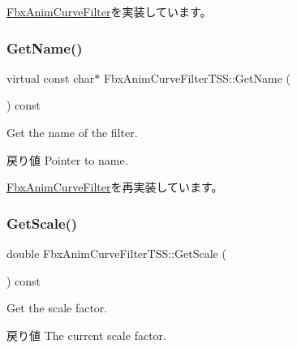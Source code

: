 \hyperlink{class_fbx_anim_curve_filter_a6a69996c47c0e6f63a0f8b0d5fa806a0}{Fbx\+Anim\+Curve\+Filter}を実装しています。

\mbox{\label{class_fbx_anim_curve_filter_t_s_s_acf96262688c855b1c9b5ead93247e758}} 
\subsubsection{\texorpdfstring{Get\+Name()}{GetName()}}
{\footnotesize\ttfamily virtual const char$\ast$ Fbx\+Anim\+Curve\+Filter\+T\+S\+S\+::\+Get\+Name (\begin{DoxyParamCaption}{ }\end{DoxyParamCaption}) const\hspace{0.3cm}{\ttfamily [virtual]}}

Get the name of the filter. \begin{DoxyReturn}{戻り値}
Pointer to name. 
\end{DoxyReturn}


\hyperlink{class_fbx_anim_curve_filter_abd559d5052fbb072042e59241940a35c}{Fbx\+Anim\+Curve\+Filter}を再実装しています。

\mbox{\label{class_fbx_anim_curve_filter_t_s_s_a0b5ee5c02fdbc4cd8cfadaa5f761280d}} 
\subsubsection{\texorpdfstring{Get\+Scale()}{GetScale()}}
{\footnotesize\ttfamily double Fbx\+Anim\+Curve\+Filter\+T\+S\+S\+::\+Get\+Scale (\begin{DoxyParamCaption}{ }\end{DoxyParamCaption}) const}

Get the scale factor. \begin{DoxyReturn}{戻り値}
The current scale factor. 
\end{DoxyReturn}
\mbox{\label{class_fbx_anim_curve_filter_t_s_s_aee0e42f4c5e802418408d0c0640f9b98}} 
